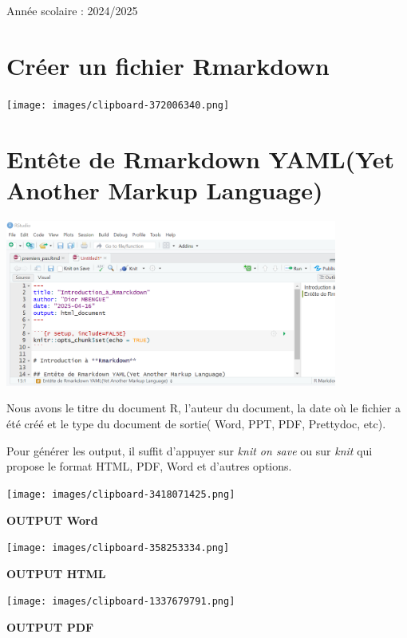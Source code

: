 \documentclass[
]{article}
\begin{document}
\begin{titlepage}
\begin{center}
        \vfill 

        {\large \textsf{Année scolaire : 2024/2025}}\\[0.5cm]
        
    \end{center}
\end{titlepage}

\section{Créer un fichier
Rmarkdown}\label{cruxe9er-un-fichier-rmarkdown}

\texttt{[image: images/clipboard-372006340.png]}

\section{Entête de Rmarkdown YAML(Yet Another Markup
Language)}\label{entuxeate-de-rmarkdown-yamlyet-another-markup-language}

\includegraphics[width=4.29167in,height=\textheight,keepaspectratio]{images/Capture d'écran 2025-04-16 223242.png}

Nous avons le titre du document R, l'auteur du document, la date où le
fichier a été créé et le type du document de sortie( Word, PPT, PDF,
Prettydoc, etc).

Pour générer les output, il suffit d'appuyer sur \emph{knit on save} ou
sur \emph{knit} qui propose le format HTML, PDF, Word et d'autres
options.

\texttt{[image: images/clipboard-3418071425.png]}

\textbf{OUTPUT Word}

\texttt{[image: images/clipboard-358253334.png]}

\textbf{OUTPUT HTML}

\texttt{[image: images/clipboard-1337679791.png]}

\textbf{OUTPUT PDF}
\end{document}
